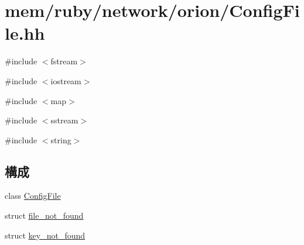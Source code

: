 \hypertarget{ConfigFile_8hh}{
\section{mem/ruby/network/orion/ConfigFile.hh}
\label{ConfigFile_8hh}
}
{\ttfamily \#include $<$fstream$>$}\par
{\ttfamily \#include $<$iostream$>$}\par
{\ttfamily \#include $<$map$>$}\par
{\ttfamily \#include $<$sstream$>$}\par
{\ttfamily \#include $<$string$>$}\par
\subsection*{構成}
\begin{DoxyCompactItemize}
\item 
class \hyperlink{classConfigFile}{ConfigFile}
\item 
struct \hyperlink{structConfigFile_1_1file__not__found}{file\_\-not\_\-found}
\item 
struct \hyperlink{structConfigFile_1_1key__not__found}{key\_\-not\_\-found}
\end{DoxyCompactItemize}
